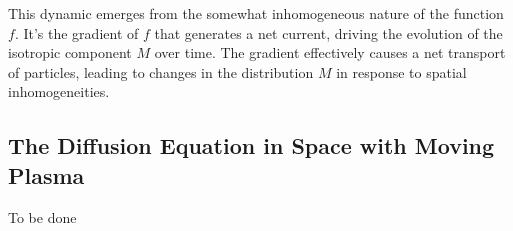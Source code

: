 This dynamic emerges from the somewhat inhomogeneous nature of the function \( f \). It's the gradient of \( f \) that generates a net current, driving the evolution of the isotropic component \( M \) over time. The gradient effectively causes a net transport of particles, leading to changes in the distribution \( M \) in response to spatial inhomogeneities.

\subsection{The Diffusion Equation in Space with Moving Plasma}

{\color{red}To be done}
